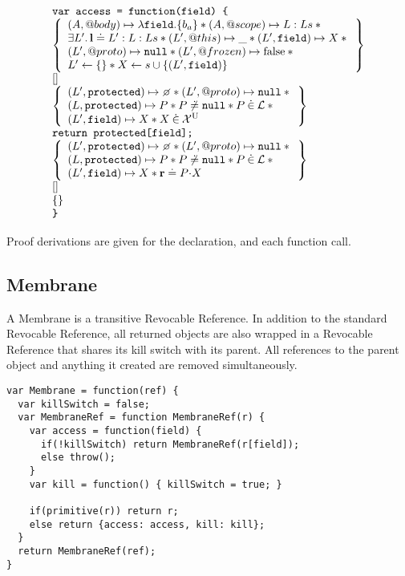\documentclass[a4paper]{article}
\begin{document}
\[
  \begin{array}{l}
    \js{var access = function(field) \{} \\
    \logic{
      (A, @body) \mapsto \lambda \js{field}.\{b_a\} \sep (A, @scope) \mapsto L:Ls \sep {} \\
      \exists L' \st \ls \doteq L' : L : Ls \sep (L',@this) \mapsto \_ \sep
      (L', \js{field}) \mapsto X \sep {} \\
      (L',@proto) \mapsto \nil \sep (L',@frozen) \mapsto \false \sep {} \\
      L' \bp \{\} \sep X \bp s \cup \{(L', \js{field})\}
    } \\
    \step{} \\
    \logic{
      (L',\js{protected}) \mapsto \none \sep (L',@proto) \mapsto \nil \sep {} \\
      (L, \js{protected}) \mapsto P \sep
      P \not\doteq \nil \sep P \dotin \loc \sep {} \\
      (L',\js{field}) \mapsto X \sep X \dotin \uvars
    } \\
    \js{return protected[field];} \\
    \logic{
      (L',\js{protected}) \mapsto \none \sep (L',@proto) \mapsto \nil \sep {} \\
      (L, \js{protected}) \mapsto P \sep
      P \not\doteq \nil \sep P \dotin \loc \sep {} \\
      (L',\js{field}) \mapsto X \sep \rv \doteq \fld{P}{X}
    } \\
    \step{} \\
    \logic{

    } \\
    \js{\}}
  \end{array}
\]


Proof derivations are given for the declaration, and each function call.

\subsection{Membrane}
A Membrane is a transitive Revocable Reference. In addition to the standard
Revocable Reference, all returned objects are also wrapped in a Revocable
Reference that shares its kill switch with its parent. All references to the
parent object and anything it created are removed simultaneously.

\begin{verbatim}
var Membrane = function(ref) {
  var killSwitch = false;
  var MembraneRef = function MembraneRef(r) {
    var access = function(field) {
      if(!killSwitch) return MembraneRef(r[field]);
      else throw();
    }
    var kill = function() { killSwitch = true; }

    if(primitive(r)) return r;
    else return {access: access, kill: kill};
  }
  return MembraneRef(ref);
}
\end{verbatim}



\end{document}
